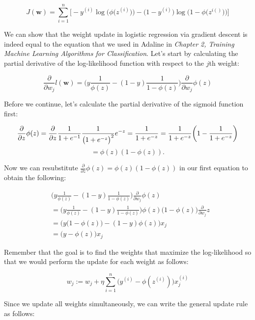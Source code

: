 \documentclass[letterpaper]{report}
\begin{document}
\[
J(\mathbf{w}) = \sum_{i=1}^{n} \Bigg[- y^{(i)} \log \bigg(\phi \big( z^{(i)} \big) \bigg) - \bigg(1 - y^{(i)} \bigg) \log \bigg( 1 - \phi \big( z^{i()} \big) \bigg)  \Bigg]
\]

We can show that the weight update in logistic regression via gradient descent is indeed equal to the equation that we used in Adaline in \textit{Chapter 2, Training Machine Learning Algorithms for Classification}. Let's start by calculating the partial derivative of the log-likelihood function with respect to the $j$th weight:

\[
\frac{\partial}{\partial w_j} l(\mathbf{w}) = \Bigg( y \frac{1}{\phi(z)}  - (1-y) \frac{1}{1-\phi(z)}   \Bigg)   \frac{\partial}{\partial w_j} \phi(z)
\]

Before we continue, let's calculate the partial derivative of the sigmoid function  first:

\[
\frac{\partial}{\partial z} \phi(z) = \frac{\partial}{\partial z} \frac{1}{1 + e^{-1}} \frac{1}{\big( 1 + e^{-z}\big)^2} e^{-z} = \frac{1}{1 + e^{-z}} = \frac{1}{1 + e^{-z}} \bigg( 1 - \frac{1}{1 + e^{-z}} \bigg) \\\\
\]
\[
= \phi(z)(1-\phi(z)).
\]

Now we can resubstitute $\frac{\partial}{\partial z} \phi(z) = \phi(z)(1-\phi(z))$ in our first equation to obtain the following:

\begin{equation*} 
\begin{split}
& \Bigg( y \frac{1}{\phi(z)} - (1-y) \frac{1}{1-\phi(z)} \Bigg) \frac{\partial}{\partial w_j} \phi(z) \\
& = \Bigg( y \frac{1}{\phi(z)} - (1-y) \frac{1}{1-\phi(z)} \Bigg) \phi(z) \big(1 - \phi(z)\big) \frac{\partial}{\partial w_j} z \\
& = \bigg(  y \big( 1 - \phi(z)   \big) - (1-y) \phi(z)  \bigg) x_j \\
& = \big( y - \phi(z)  \big) x_j
\end{split}
\end{equation*}

Remember that the goal is to find the weights that maximize the log-likelihood so that we would perform the update for each weight as follows:

\[
w_j := w_j + \eta \sum_{i=1}^{n} \bigg( y^{(i)} - \phi(z^{(i)}) \bigg) x_{j}^{(i)}
\]

Since we update all weights simultaneously, we can write the general update rule as follows:
\end{document}
